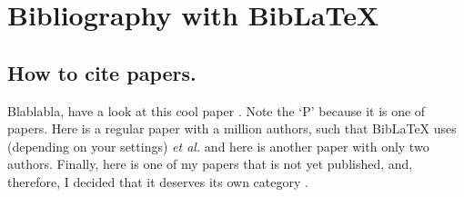 \chapter{Bibliography with BibLaTeX}\label{cha:biblatex}

\section{How to cite papers.}
Blablabla, have a look at this cool paper \cite{berke_transmon_2022}. Note the `P' because it is one of  papers. Here is a regular paper \cite{aruteQuantumSupremacyUsing2019a} with a million authors, such that BibLaTeX uses (depending on your settings) \textit{et al.} and here is another paper \cite{magesan_effective_2020} with only two authors. Finally, here is one of my papers that is not yet published, and, therefore, I decided that it deserves its own category \cite{inpreparation}.
